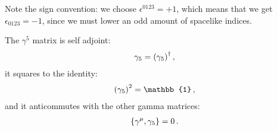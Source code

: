 \documentclass[main.tex]{subfiles}
\begin{document}
Note the sign convention: we choose \(\epsilon^{0123} = +1 \), which means that we get \(\epsilon_{0123} = -1\), since we must lower an odd amount of spacelike indices.

\begin{claim}
The \(\gamma^{5}\) matrix is self adjoint: 
%
\begin{align}
\gamma_{5} = \qty(\gamma_{5})^\dag
\,,
\end{align}
%
it squares to the identity: 
%
\begin{align}
\qty(\gamma_5 )^2 = \mathbb{1}
\,,
\end{align}
%
and it anticommutes with the other gamma matrices: 
%
\begin{align}
\qty{\gamma^{\mu } , \gamma_5 } = 0
\,.
\end{align}
\end{claim}
\end{document}
